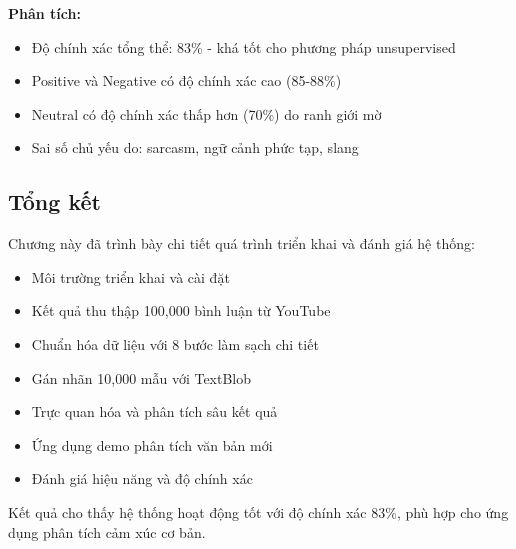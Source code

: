 \textbf{Phân tích:}
\begin{itemize}
    \item Độ chính xác tổng thể: 83\% - khá tốt cho phương pháp unsupervised
    \item Positive và Negative có độ chính xác cao (85-88\%)
    \item Neutral có độ chính xác thấp hơn (70\%) do ranh giới mờ
    \item Sai số chủ yếu do: sarcasm, ngữ cảnh phức tạp, slang
\end{itemize}

\subsection{Tổng kết}
Chương này đã trình bày chi tiết quá trình triển khai và đánh giá hệ thống:
\begin{itemize}
    \item Môi trường triển khai và cài đặt
    \item Kết quả thu thập 100,000 bình luận từ YouTube
    \item Chuẩn hóa dữ liệu với 8 bước làm sạch chi tiết
    \item Gán nhãn 10,000 mẫu với TextBlob
    \item Trực quan hóa và phân tích sâu kết quả
    \item Ứng dụng demo phân tích văn bản mới
    \item Đánh giá hiệu năng và độ chính xác
\end{itemize}

Kết quả cho thấy hệ thống hoạt động tốt với độ chính xác 83\%, phù hợp cho ứng dụng phân tích cảm xúc cơ bản.
